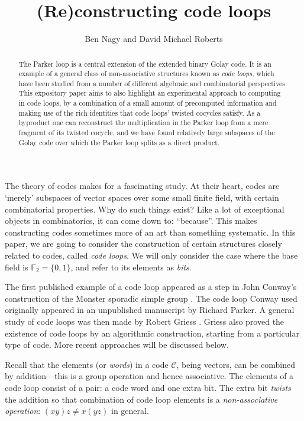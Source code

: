 \documentclass{article}
\theoremstyle{plain}
\theoremstyle{definition}
\def \cC {\mathcal{C}}
\def \FF {\mathbb{F}}
\begin{document}
\title{(Re)constructing code loops}
\author{Ben Nagy and David Michael Roberts}

\maketitle

\begin{abstract}
The Parker loop is a central extension of the extended binary Golay code. It is an example of a general class of non-associative structures known as \emph{code loops}, which have been studied from a number of different algebraic and combinatorial perspectives.
This expository paper aims to also highlight an experimental approach to computing in code loops, by a combination of a small amount of precomputed information and making use of the rich identities that code loops' twisted cocycles satisfy.
As a byproduct one can reconstruct the multiplication in the Parker loop from a mere fragment of its twisted cocycle, and we have found relatively large subspaces of the Golay code over which the Parker loop splits as a direct product.
\end{abstract}


\noindent
The theory of codes makes for a fascinating study. 
At their heart, codes are `merely' subspaces of vector spaces over some small finite field, with certain combinatorial properties.
Why do such things exist? Like a lot of exceptional objects in combinatorics, it can come down to: ``because''.
This makes constructing codes sometimes more of an art than something systematic.
In this paper, we are going to consider the construction of certain structures closely related to codes, called \emph{code loops}. 
We will only consider the case where the base field is $\FF_2=\{0,1\}$, and refer to its elements as \emph{bits}.

The first published example of a code loop appeared as a step in John Conway's construction of the Monster sporadic simple group \cite{Conway}. 
The code loop Conway used originally appeared in an unpublished manuscript by Richard Parker.
A general study of code loops was then made by Robert Griess \cite{Griess}.
Griess also proved the existence of code loops by an algorithmic construction, starting from a particular type of code.
More recent approaches will be discussed below.

Recall that the elements (or \emph{words}) in a code $\cC$, being vectors, can be combined by addition---this is a group operation and hence associative. 
The elements of a code loop consist of a pair: a code word and one extra bit.
The extra bit \emph{twists} the addition so that combination of code loop elements is a \emph{non-associative operation}: $(xy)z\not=x(yz)$ in general.
\end{document}
